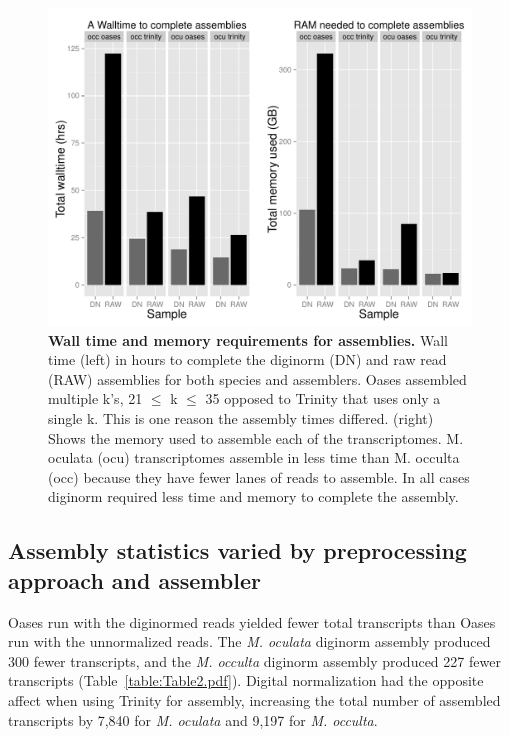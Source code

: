 \begin{figure}[tbp]
\centering
\includegraphics[scale=0.5]{manuscript/figure_1_time_and_memory.pdf}
\caption{\textbf{Wall time and memory requirements for assemblies.} Wall time (left) in hours to complete the diginorm (DN) and raw read (RAW) assemblies for both species and assemblers. Oases assembled multiple k's, 21 $\leq$ k $\leq$ 35 opposed to Trinity that uses only a single k. This is one reason the assembly times differed. (right) Shows the memory used to assemble each of the transcriptomes. M. oculata (ocu) transcriptomes assemble in less time than M. occulta (occ) because they have fewer lanes of reads to assemble. In all cases diginorm required less time and memory to complete the assembly.}
\label{fig:time_and_memory.pdf}
\end{figure}
  
\subsection{Assembly statistics varied by preprocessing approach and assembler}
Oases run with the diginormed reads yielded fewer total transcripts than Oases run with the unnormalized reads. The \textit{M. oculata} diginorm assembly produced 300 fewer transcripts, and the \textit{M. occulta} diginorm assembly produced 227 fewer transcripts (Table~\ref{table:Table2.pdf}). Digital normalization had the opposite affect when using Trinity for assembly, increasing the total number of assembled transcripts by 7,840 for \textit{M. oculata} and 9,197 for \textit{M. occulta}.


